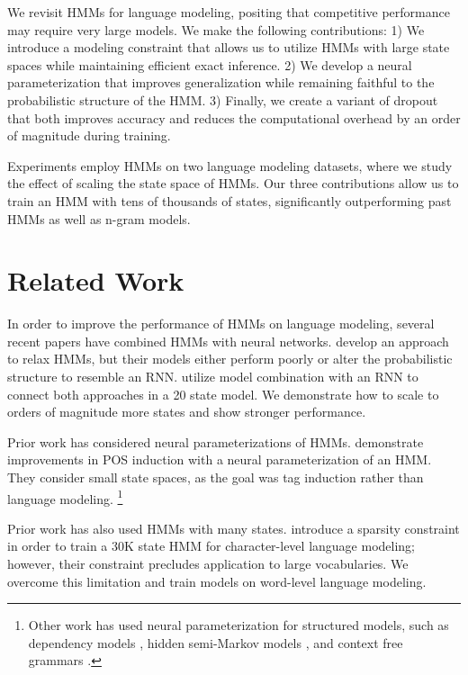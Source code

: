 \documentclass[11pt,a4paper]{article}
\begin{document}
We revisit HMMs for language modeling,
positing that competitive performance may require very large models. 
We make the following contributions:
1) We introduce a modeling constraint that allows us to
utilize HMMs with large state spaces while maintaining efficient exact inference.
2) We develop a neural parameterization that improves
generalization while remaining faithful to the
probabilistic structure of the HMM.
3) Finally, we create a variant of dropout that both improves accuracy
and reduces the computational overhead by an order of magnitude during training. 

Experiments employ HMMs on two language modeling datasets,
where we study the effect of scaling the state space of HMMs.
Our three contributions allow us to train an HMM with tens of thousands of states,
significantly outperforming past HMMs as well as n-gram models.

\section{Related Work}
\label{sec:rw}
In order to improve the performance of HMMs on language modeling,
several recent papers have combined HMMs with neural networks.
\citet{buys2018hmm} develop an approach to relax HMMs,
but their models either perform poorly or alter the probabilistic structure to resemble an RNN. 
\citet{krakovna2016hmm} utilize model combination with an RNN to connect both approaches in a
20 state model.
We demonstrate how to scale to orders of magnitude more states and show stronger performance.

Prior work has considered neural parameterizations of HMMs. 
\citet{tran2016hmm} demonstrate improvements in POS induction with a
neural parameterization of an HMM.
They consider small state spaces,
as the goal was tag induction rather than language modeling.
\footnote{
Other work has used neural parameterization for structured models, such as 
dependency models \citep{han2017dependency},
hidden semi-Markov models \citep{wiseman2018hsmm},
and context free grammars \citep{kim2019cpcfg}.
}

Prior work has also used HMMs with many states.
\citet{dedieu2019learning} introduce a sparsity constraint
in order to train a 30K state HMM for character-level language modeling;
however, their constraint precludes application to large vocabularies.
We overcome this limitation and train models on word-level language modeling.
\end{document}
